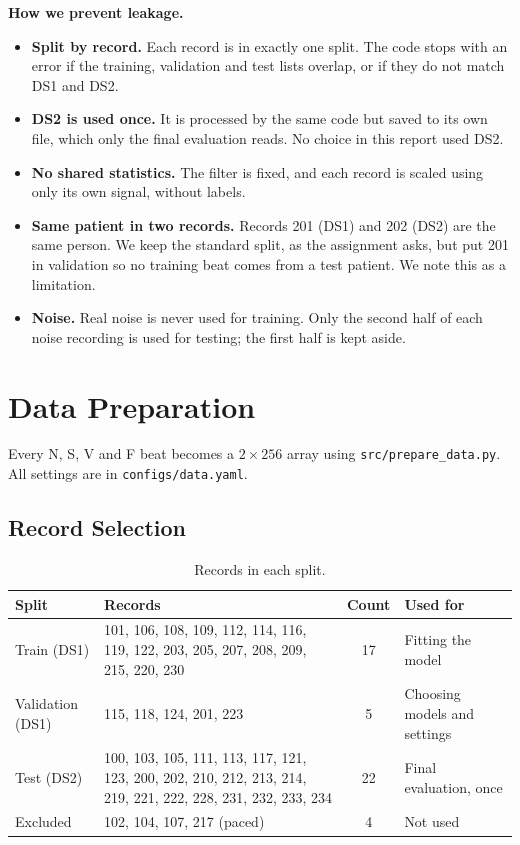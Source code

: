 \documentclass[11pt,a4paper]{article}
\newcommand{\code}[1]{\texttt{#1}}
\begin{document}
\textbf{How we prevent leakage.}
\begin{itemize}
  \item \textbf{Split by record.} Each record is in exactly one split. The code stops with an error if the training, validation and test lists overlap, or if they do not match DS1 and DS2.
  \item \textbf{DS2 is used once.} It is processed by the same code but saved to its own file, which only the final evaluation reads. No choice in this report used DS2.
  \item \textbf{No shared statistics.} The filter is fixed, and each record is scaled using only its own signal, without labels.
  \item \textbf{Same patient in two records.} Records 201 (DS1) and 202 (DS2) are the same person. We keep the standard split, as the assignment asks, but put 201 in validation so no training beat comes from a test patient. We note this as a limitation.
  \item \textbf{Noise.} Real noise is never used for training. Only the second half of each noise recording is used for testing; the first half is kept aside.
\end{itemize}

\section{Data Preparation}

Every N, S, V and F beat becomes a $2 \times 256$ array using \code{src/prepare\_data.py}. All settings are in \code{configs/data.yaml}.

\subsection{Record Selection}

\begin{table}[H]
\centering
\small
\caption{Records in each split.}
\label{tab:records}
\begin{tabularx}{\textwidth}{@{} l L c L @{}}
\toprule
Split & Records & Count & Used for \\
\midrule
Train (DS1) & 101, 106, 108, 109, 112, 114, 116, 119, 122, 203, 205, 207, 208, 209, 215, 220, 230 & 17 & Fitting the model \\
Validation (DS1) & 115, 118, 124, 201, 223 & 5 & Choosing models and settings \\
Test (DS2) & 100, 103, 105, 111, 113, 117, 121, 123, 200, 202, 210, 212, 213, 214, 219, 221, 222, 228, 231, 232, 233, 234 & 22 & Final evaluation, once \\
Excluded & 102, 104, 107, 217 (paced) & 4 & Not used \\
\bottomrule
\end{tabularx}
\end{table}
\end{document}
